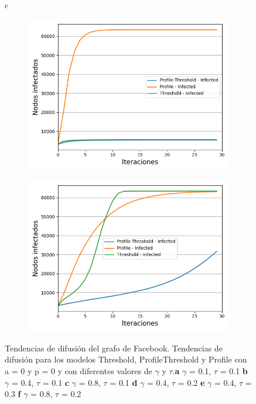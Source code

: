 \documentclass{article}
\begin{document}
\begin{figure}{c}
\begin{subfigure}[b]{0.5\textwidth}
		\includegraphics[width=\textwidth]{../Images/Fig 4 e).png}
		\caption{}
		\label{fig:f45}
	\end{subfigure}
	\hfill
	\begin{subfigure}[b]{0.5\textwidth}
		\includegraphics[width=\textwidth]{../Images/Fig 4 f).png}
		\caption{}
		\label{fig:f46}
	\end{subfigure}
	\caption{Tendencias de difusión del grafo de Facebook. Tendencias de difusión para los modelos Threshold, ProfileThreshold y Profile con a = 0 y p = 0 y con diferentes valores de $\gamma$ y $\tau$.\textbf{a} $\gamma$ = 0.1, $\tau$ = 0.1 \textbf{b} $\gamma$ = 0.4, $\tau$ = 0.1 \textbf{c} $\gamma$ = 0.8, $\tau$ = 0.1 \textbf{d} $\gamma$ = 0.4, $\tau$ = 0.2 \textbf{e} $\gamma$ = 0.4, $\tau$ = 0.3 \textbf{f} $\gamma$ = 0.8, $\tau$ = 0.2}
\end{figure}
\end{document}
